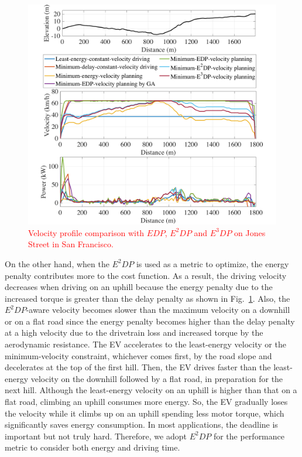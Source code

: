\documentclass{IEEEtran}
\begin{document}
\begin{figure} %
\centering
\includegraphics[width=\hsize]{Figures/EDP_comp_profile.pdf}
\caption{\textcolor{red}{Velocity profile comparison with $EDP$, $E^2DP$ and $E^3DP$ on  Jones Street in San Francisco.}}
\label{fig:EDP_aware_velocity_planning}
\end{figure} 

On the other hand, when the $E^2DP$ is used as a metric to optimize, the energy penalty contributes more to the cost function. As a result, the driving velocity decreases when driving on an uphill because the energy penalty due to the increased torque is greater than the delay penalty as shown in Fig.~\ref{fig:EDP_aware_velocity_planning}. Also, the $E^2DP$-aware velocity becomes slower than the maximum velocity on a downhill or on a flat road since the energy penalty becomes higher than the delay penalty at a high velocity due to the drivetrain loss and increased torque by the aerodynamic resistance. The EV accelerates to the least-energy velocity or the minimum-velocity constraint, whichever comes first, by the road slope and decelerates at the top of the first hill. Then, the EV drives faster than the least-energy velocity on the downhill followed by a  flat road, in preparation for the next hill. Although the least-energy velocity on an uphill is higher than that on a flat road, climbing an uphill consumes more energy. So, the EV gradually loses the velocity while it climbs up on an uphill spending less motor torque, which significantly saves energy consumption. In most applications, the deadline is important but not truly hard. Therefore, we adopt $E^2DP$ for the performance metric to consider both energy and driving time.
\end{document}
